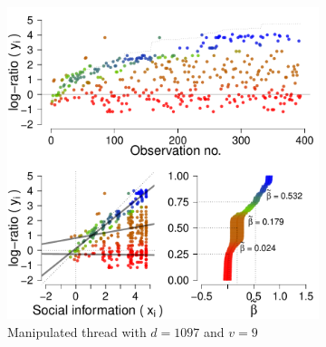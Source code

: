 \documentclass[9pt,a4paper,twocolumn,lineno]{article}
\begin{document}
\begin{figure}[!h]
\begin{subfigure}{.44\linewidth}
		\includegraphics[width=1\linewidth]{m10979.pdf}
		\caption{\footnotesize Manipulated thread with $d=1097$ and $v=9$}
		\label{fig: h=max d=1097, v=9}
	\end{subfigure}
	\begin{subfigure}{.1\linewidth}
		\centering

\end{subfigure}
\end{figure}
\end{document}
